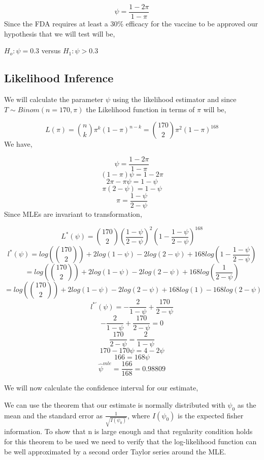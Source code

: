 \documentclass[
  11pt,
]{article}
\begin{document}
\[\psi = \frac{1 - 2\pi}{1 - \pi}\] Since the FDA requires at least a
30\% efficacy for the vaccine to be approved our hypothesis that we will
test will be,

\(H_o : \psi = 0.3\) versus \(H_1 : \psi > 0.3\)

\subsection{Likelihood Inference}\label{likelihood-inference}

We will calculate the parameter \(\psi\) using the likelihood estimator
and since \(T \sim Binom(n = 170, \pi)\) the Likelihood function in
terms of \(\pi\) will be,

\[L(\pi) = \binom{n}{k}\pi^k(1-\pi)^{n - k} =\binom{170}{2}\pi^2(1-\pi)^{168} \]
We have,

\[\psi = \frac{1 - 2\pi}{1 - \pi}\] \[(1 - \pi)\psi = 1 - 2\pi\]
\[2\pi- \pi\psi = 1 - \psi\] \[\pi(2 - \psi) = 1 - \psi\]
\[\pi = \frac{1 - \psi}{2 - \psi}\] Since MLEs are invariant to
transformation,

\[L^*(\psi)  =\binom{170}{2}(\frac{1 - \psi}{2 - \psi})^2(1-\frac{1 - \psi}{2 - \psi})^{168} \]
\[l^*(\psi)  =log(\binom{170}{2}) + 2log(1 - \psi) - 2log(2 - \psi) +168log(1-\frac{1 - \psi}{2 - \psi}) \]
\[ =log(\binom{170}{2}) + 2log(1 - \psi) - 2log(2 - \psi) +168log(\frac{1 }{2 - \psi}) \]
\[ =log(\binom{170}{2}) + 2log(1 - \psi) - 2log(2 - \psi) +168log(1) - 168log(2 - \psi) \]
\[l^{*'}(\psi)  = -\frac{2}{1 - \psi} + \frac{170}{2 - \psi} \]
\[-\frac{2}{1 - \psi} + \frac{170}{2 - \psi} = 0\]
\[\frac{170}{2 - \psi} = \frac{2}{1 - \psi}\]
\[170 - 170\psi = 4 - 2\psi\] \[166 = 168\psi\]
\[\hat \psi^{mle} = \frac{166}{168} = 0.98809\]

We will now calculate the confidence interval for our estimate,

We can use the theorem that our estimate is normally distributed with
\(\psi_0\) as the mean and the standard error as
\(\frac{1}{\sqrt{I(\psi_0)}}\), where \(I(\psi_0)\) is the expected
fisher information. To show that n is large enough and that regularity
condition holds for this theorem to be used we need to verify that the
log-likelihood function can be well approximated by a second order
Taylor series around the MLE.
\end{document}
